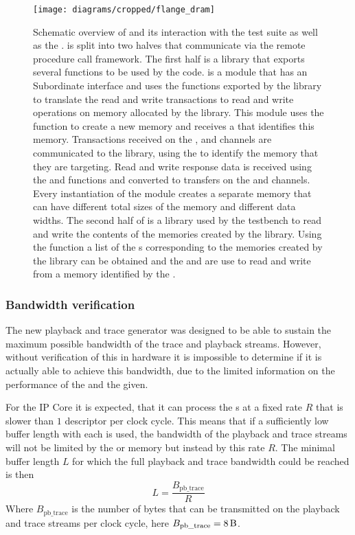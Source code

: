 \begin{figure}[htbp]
\centerline{\texttt{[image: diagrams/cropped/flange\_dram]}}
\caption{Schematic overview of \flangedram{} and its interaction with the \cpp{} test suite as well as the \systemverilog{} \DUT{}. \flangedram{} is split into two halves that communicate via the \RCF{} remote procedure call framework. The first half is a \DPI{} library that exports several functions to be used by the \systemverilog{} code.  is a \systemverilog{} module that has an \AXI{} Subordinate interface and uses the functions exported by the \flangedram{} \DPI{} library to translate the \AXI{} read and write transactions to read and write operations on memory allocated by the \flangedram{} library. This module uses the  function to create a new memory and receives a  that identifies this memory. Transactions received on the \AW{}, \AR{} and \W{} \AXI{} channels are communicated to the \DPI{} library, using the  to identify the memory that they are targeting. Read and write response data is received using the  and  functions and converted to transfers on the \R{} and \B{} channels. Every instantiation of the  module creates a separate memory that can have different total sizes of the memory and different \AXI{} data widths.
The second half of \flangedram{} is a library used by the \cpp{} testbench to read and write the contents of the memories created by the \DPI{} library. Using the  function a list of the s corresponding to the memories created by the \DPI{} library can be obtained and the  and  are use to read and write from a memory identified by the .}\label{dia:flange-dram-overview}
\end{figure}

\subsubsection{Bandwidth verification}\label{sec:pb_trace_verif}
The new playback and trace generator was designed to be able to sustain the maximum possible bandwidth of the trace and playback streams. However, without verification of this in hardware it is impossible to determine if it is actually able to achieve this bandwidth, due to the limited information on the performance of the \AXIDMA{} and the \XilinxMIG{} given.

For the \AXIDMA{} IP Core it is expected, that it can process the \descriptor{}s at a fixed rate $R$ that is slower than $1$ descriptor per clock cycle. This means that if a sufficiently low buffer length with each \descriptor{} is used, the bandwidth of the playback and trace streams will not be limited by the \XilinxMIG{} or \DDR{} memory but instead by this rate $R$.
The minimal buffer length $L$ for which the full playback and trace bandwidth could be reached is then
\[L = \frac{B_{\text{pb\_trace}}}{R}\]
Where $B_{\text{pb\_trace}}$ is the number of bytes that can be transmitted on the playback and trace streams per clock cycle, here $B_{\text{pb\_trace}} = \SI{8}{\byte}$.

